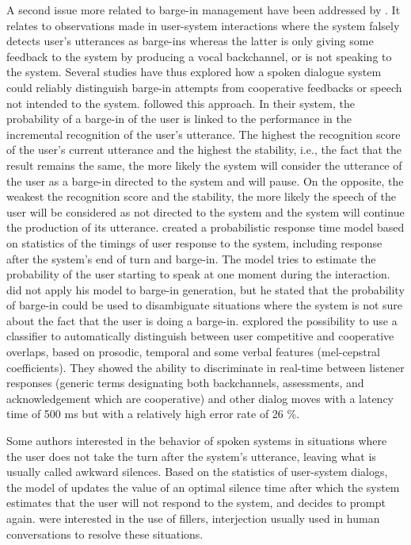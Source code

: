 A second issue more related to barge-in management have been addressed by \cite{selfridge_continuously_2013}. It relates to observations made in user-system interactions where the system falsely detects user's utterances as barge-ins whereas the latter is only giving some feedback to the system by producing a vocal backchannel, or is not speaking to the system. Several studies have thus explored how a spoken dialogue system could reliably distinguish barge-in attempts from cooperative feedbacks or speech not intended to the system. 
\cite{selfridge_continuously_2013} followed this approach. In their system, the probability of a barge-in of the user is linked to the performance in the incremental recognition of the user's utterance. The highest the recognition score of the user's current utterance and the highest the stability, i.e., the fact that the result remains the same, the more likely the system will consider the utterance of the user as a barge-in directed to the system and will pause. 
On the opposite, the weakest the recognition score and the stability, the more likely the speech of the user will be considered as not directed to the system and the system will continue the production of its utterance. 
\cite{witt_modeling_2014} created a probabilistic response time model based on statistics of the timings of user response to the system, including response after the system's end of turn and barge-in. The model tries to estimate the probability of the user starting to speak at one moment during the interaction. 
\cite{witt_modeling_2014} did not apply his model to barge-in generation, but he stated that the probability of barge-in could be used to disambiguate situations where the system is not sure about the fact that the user is doing a barge-in. \cite{reidsma_continuous_2011} explored the possibility to use a classifier to automatically distinguish between user competitive and cooperative overlaps, based on prosodic, temporal and some verbal features (mel-cepstral coefficients). They showed the ability to discriminate in real-time between listener responses (generic terms designating both backchannels, assessments, and acknowledgement which are cooperative) and other dialog moves with a latency time of 500 ms but with a relatively high error rate of 26 \%. 

Some authors interested in the behavior of spoken systems in situations where the user does not take the turn after the system's utterance, leaving what is usually called awkward silences. Based on the statistics of user-system dialogs, the model of \citep{witt_modeling_2014} updates the value of an optimal silence time after which the system estimates that the user will not respond to the system, and decides to prompt again. \cite{ohshima_conversational_2015} were interested in the use of fillers, interjection usually used in human conversations to resolve these situations. 

